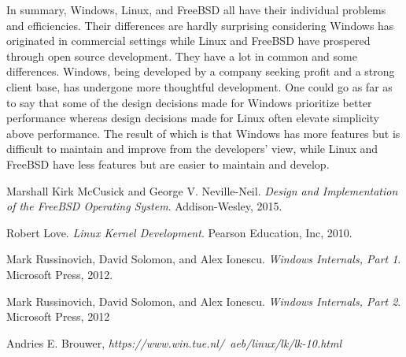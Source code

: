 \documentclass[letterpaper,10pt,onecolumn,draftclsnofoot,]{article}
\begin{document}
In summary, Windows, Linux, and FreeBSD all have their individual problems and efficiencies. Their differences are hardly surprising considering Windows has originated in commercial settings while Linux and FreeBSD have prospered through open source development. They have a lot in common and some differences. Windows, being developed by a company seeking profit and a strong client base, has undergone more thoughtful development. One could go as far as to say that some of the design decisions made for Windows prioritize better performance whereas design decisions made for Linux often elevate simplicity above performance. The result of which is that Windows has more features but is difficult to maintain and improve from the developers’ view, while Linux and FreeBSD have less features but are easier to maintain and develop.

\pagebreak

\begin{thebibliography}{9}
Marshall Kirk McCusick and George V. Neville-Neil. 
\textit{Design and Implementation of the FreeBSD Operating System}. 
Addison-Wesley, 2015.

Robert Love. 
\textit{Linux Kernel Development}. 
Pearson Education, Inc, 2010.
 
Mark Russinovich, David Solomon, and Alex Ionescu. 
\textit{Windows Internals, Part 1}. 
Microsoft Press, 2012.

Mark Russinovich, David Solomon, and Alex Ionescu. 
\textit{Windows Internals, Part 2}. 
Microsoft Press, 2012

Andries E. Brouwer,
\textit{https://www.win.tue.nl/~aeb/linux/lk/lk-10.html}

\end{thebibliography}
\end{document}
